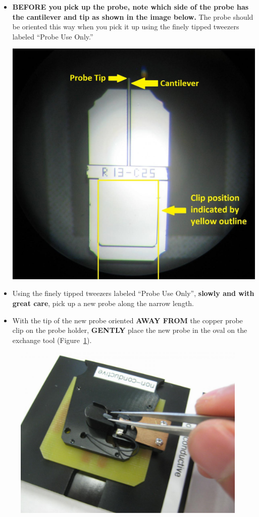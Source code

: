 \documentclass{../lab}
\begin{document}
\begin{enumerate}
    \begin{itemize}
        \item \textbf{BEFORE you pick up the probe, note which side of the probe has the cantilever and tip as shown in the image below.}  The probe should be oriented this way when you pick it up using the finely tipped tweezers labeled ``Probe Use Only.''
    
        \begin{center}
            \href{http://experimentationlab.berkeley.edu/sites/default/files/AFMImages/AFMprobe.JPG}{\includegraphics[width=0.5\linewidth]{images/AFMprobe.JPG}}
        \end{center}
    
        \item Using the finely tipped tweezers labeled ``Probe Use Only'', \textbf{slowly and with great care}, pick up a new probe along the narrow length.
    
        \item With the tip of the new probe oriented \textbf{AWAY FROM} the copper probe clip on the probe holder, \textbf{GENTLY} place the new probe in the oval on the exchange tool (Figure~\ref{fig:ExchangeTool}).
    \end{itemize}
    
    \begin{figure}[H]
        \centering
        \href{http://experimentationlab.berkeley.edu/sites/default/files/AFMImages/21.JPG}{\includegraphics[width=0.5\linewidth]{images/21.JPG}}
        \caption{}
        \label{fig:ExchangeTool}
    \end{figure}
    

\end{enumerate}
\end{document}
